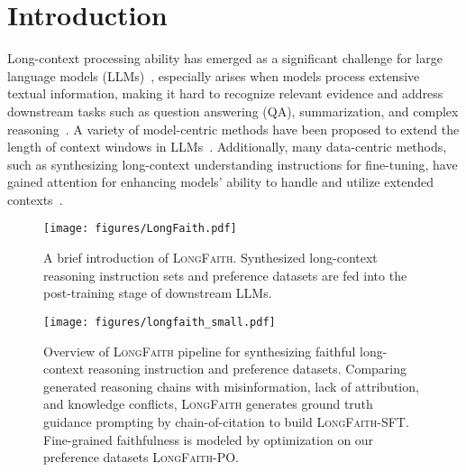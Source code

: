 \section{Introduction}
\label{sec:intro}

Long-context processing ability has emerged as a significant challenge for large language models (LLMs)~\cite{distracted, lostinthemiddle, irrelevant, sametaskmoretokens}, especially arises when models process extensive textual information, making it hard to recognize relevant evidence and address downstream tasks such as question answering (QA), summarization, and complex reasoning~\cite{longbench, longbenchv2, bench, ruler, helmet}. A variety of model-centric methods have been proposed to extend the length of context windows in LLMs~\cite{extending, longlora, yarn, lminfinite, longrope}. Additionally, many data-centric methods, such as synthesizing long-context understanding instructions for fine-tuning, have gained attention for enhancing models’ ability to handle and utilize extended contexts~\cite{effective, in2, dataengineering, longalign, coc, prolong, longmit, longreward, sealong}.

\begin{figure}[t]
    \centering
    \texttt{[image: figures/LongFaith.pdf]}
    \caption{A brief introduction of \textsc{LongFaith}. Synthesized long-context reasoning instruction sets and preference datasets are fed into the post-training stage of downstream LLMs.}
    \label{fig:small}
    \vspace{-5pt}
\end{figure}

\begin{figure*}[t]
    \centering
    \centerline{\texttt{[image: figures/longfaith\_small.pdf]}}
    \caption{Overview of \textsc{LongFaith} pipeline for synthesizing faithful long-context reasoning instruction and preference datasets. Comparing generated reasoning chains with misinformation, lack of attribution, and knowledge conflicts, \textsc{LongFaith} generates ground truth guidance prompting by chain-of-citation to build \textsc{LongFaith}-SFT. Fine-grained faithfulness is modeled by optimization on our preference datasets \textsc{LongFaith}-PO.}
    \label{fig:main}
\end{figure*}

